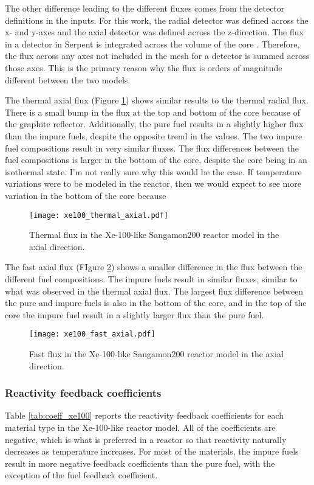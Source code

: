 The other difference leading to the different fluxes comes from the detector 
definitions in the inputs. For this work, the radial detector 
was defined across the x- and y-axes and the axial detector was defined 
across the z-direction. The flux in a detector in Serpent is integrated 
across the volume of the core \cite{leppanen_serpent_2013}. Therefore, 
the flux across any axes not included in the mesh for a detector is 
summed across those axes. This is the primary reason why the flux is 
orders of magnitude different between the two models. 

The thermal axial flux (Figure \ref{fig:xe100_thermal_axial}) shows 
similar results to the thermal radial flux. There is a small bump in the 
flux at the top and bottom of the core because of the graphite reflector.
Additionally, the pure fuel results in a slightly higher flux than 
the impure fuels, despite the opposite trend in the \keff values. The 
two impure fuel compositions result in very similar fluxes. The flux 
differences between the fuel compositions is larger in the bottom 
of the core, despite the core being in an isothermal state. I'm not really 
sure why this would be the case. If temperature variations were to be modeled 
in the reactor, then we would expect to see more variation in the bottom of 
the core because 
\begin{figure}
        \centering 
        \texttt{[image: xe100\_thermal\_axial.pdf]}
        \caption{Thermal flux in the Xe-100-like Sangamon200 
        reactor model in the axial direction.}
        \label{fig:xe100_thermal_axial}
\end{figure}

The fast axial flux (FIgure \ref{fig:xe100_fast_axial}) shows a smaller 
difference in the flux between the different fuel compositions. The 
impure fuels result in similar fluxes, similar to what was observed in 
the thermal axial flux. The largest flux difference between the pure 
and impure fuels is also in the bottom of the core, and in the top 
of the core the impure fuel result in a slightly larger flux than the pure 
fuel. 
\begin{figure}
        \centering 
        \texttt{[image: xe100\_fast\_axial.pdf]}
        \caption{Fast flux in the Xe-100-like Sangamon200 
        reactor model in the axial direction.}
        \label{fig:xe100_fast_axial}
\end{figure}

\subsubsection{Reactivity feedback coefficients}
Table \ref{tab:coeff_xe100} reports the reactivity feedback 
coefficients for each material type in the Xe-100-like reactor model. 
All of the coefficients are negative, which is what is preferred in 
a reactor so that reactivity naturally decreases as temperature increases. 
For most of the materials, the impure fuels result in more negative 
feedback coefficients than the pure fuel, with the exception of the fuel 
feedback coefficient. 



